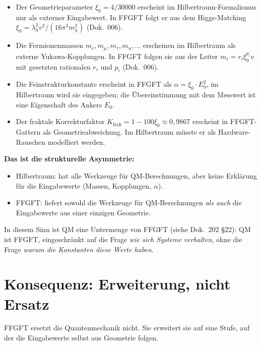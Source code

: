 \begin{itemize}[leftmargin=2em,itemsep=2pt,topsep=2pt]
  \item Der Geometrieparameter $\xi_0 = 4/30000$ erscheint im
        Hilbertraum-Formalismus nur als externer Eingabewert. In
        FFGFT folgt er aus dem Higgs-Matching $\xi_0 = \lambda_h^2
        v^2/(16\pi^3 m_h^2)$ (Dok.~006).
  \item Die Fermionenmassen $m_e, m_\mu, m_\tau, m_u, \ldots$
        erscheinen im Hilbertraum als externe Yukawa-Kopplungen.
        In FFGFT folgen sie aus der Leiter
        $m_i = r_i \xi_0^{p_i} v$ mit gesetzten rationalen $r_i$
        und $p_i$ (Dok.~006).
  \item Die Feinstrukturkonstante erscheint in FFGFT als
        $\alpha = \xi_0 \cdot E_0^2$, im Hilbertraum wird sie
        eingegeben; die Übereinstimmung mit dem Messwert ist eine
        Eigenschaft des Ankers $E_0$.
  \item Der fraktale Korrekturfaktor $K_{\text{frak}} = 1 - 100\xi_0
        \approx 0{,}9867$ erscheint in FFGFT-Gattern als
        Geometrieabweichung. Im Hilbertraum müsste er als Hardware-
        Rauschen modelliert werden.
\end{itemize}

\textbf{Das ist die strukturelle Asymmetrie:}
\begin{itemize}[leftmargin=2em,itemsep=2pt,topsep=2pt]
  \item Hilbertraum: hat alle Werkzeuge für QM-Berechnungen, aber
        keine Erklärung für die Eingabewerte (Massen, Kopplungen,
        $\alpha$).
  \item FFGFT: liefert sowohl die Werkzeuge für QM-Berechnungen
        \emph{als auch} die Eingabewerte aus einer einzigen
        Geometrie.
\end{itemize}

In diesem Sinn ist QM eine Untermenge von FFGFT (siehe Dok.~202 §22):
QM ist FFGFT, eingeschränkt auf die Frage \emph{wie sich Systeme
verhalten}, ohne die Frage \emph{warum die Konstanten diese Werte
haben}.

\section{Konsequenz: Erweiterung, nicht Ersatz}

FFGFT ersetzt die Quantenmechanik nicht. Sie erweitert sie auf eine
Stufe, auf der die Eingabewerte selbst aus Geometrie folgen.

